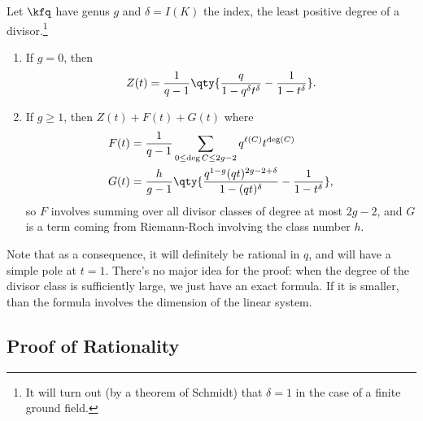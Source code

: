\begin{proposition}

Let \(\kfq\) have genus \(g\) and \(\delta = I(K)\) the index, the least
positive degree of a divisor.\footnote{It will turn out (by a theorem of
  Schmidt) that \(\delta = 1\) in the case of a finite ground field.}

\begin{enumerate}
\def\labelenumi{\alph{enumi}.}
\item
  If \(g=0\), then
  \begin{align*}  
  Z(t) = {1\over q-1} \qty{{q \over 1-q^\delta t^\delta} - {1 \over 1-t^\delta}}
  .\end{align*}
\item
  If \(g\geq 1\), then \(Z(t) + F(t) + G(t)\) where
  \begin{align*}  
  F(t) 
  &= {1\over q-1} \sum_{0\leq \deg C \leq 2g-2} q^{\ell(C)} t^{\deg(C)} \\
  G(t)
  &= {h \over g-1} \qty{
  { q^{1-g} (qt)^{2g-2+\delta} \over 1 - (qt)^\delta } - {1 \over 1 - t^\delta}
  }
  ,\end{align*} so \(F\) involves summing over all divisor classes of
  degree at most \(2g-2\), and \(G\) is a term coming from Riemann-Roch
  involving the class number \(h\).
\end{enumerate}

\end{proposition}

\begin{remark}

Note that as a consequence, it will definitely be rational in \(q\), and
will have a simple pole at \(t=1\). There's no major idea for the proof:
when the degree of the divisor class is sufficiently large, we just have
an exact formula. If it is smaller, than the formula involves the
dimension of the linear system.

\end{remark}

\hypertarget{proof-of-rationality}{%
\subsection{Proof of Rationality}\label{proof-of-rationality}}


